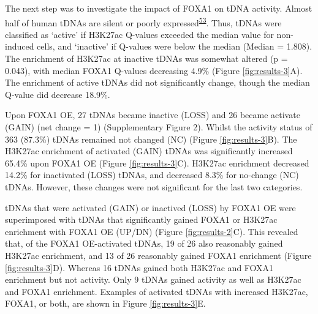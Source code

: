 \documentclass[
  12pt,
]{article}
\begin{document}
The next step was to investigate the impact of FOXA1 on tDNA activity.
Almost half of human tDNAs are silent or poorly expressed\textsuperscript{\protect\hyperlink{ref-Torres2019}{53}}.
Thus, tDNAs were classified as `active' if H3K27ac Q-values exceeded the median value for non-induced cells, and `inactive' if Q-values were below the median (Median = 1.808).
The enrichment of H3K27ac at inactive tDNAs was somewhat altered (p = 0.043), with median FOXA1 Q-values decreasing 4.9\% (Figure \ref{fig:results-3}A).
The enrichment of active tDNAs did not significantly change, though the median Q-value did decrease 18.9\%.

Upon FOXA1 OE, 27 tDNAs became inactive (LOSS) and 26 became activate (GAIN) (net change = 1) (Supplementary Figure 2).
Whilst the activity status of 363 (87.3\%) tDNAs remained not changed (NC) (Figure \ref{fig:results-3}B).
The H3K27ac enrichment of activated (GAIN) tDNAs was significantly increased 65.4\% upon FOXA1 OE (Figure \ref{fig:results-3}C).
H3K27ac enrichment decreased 14.2\% for inactivated (LOSS) tDNAs, and decreased 8.3\% for no-change (NC) tDNAs.
However, these changes were not significant for the last two categories.

tDNAs that were activated (GAIN) or inactived (LOSS) by FOXA1 OE were superimposed with tDNAs that significantly gained FOXA1 or H3K27ac enrichment with FOXA1 OE (UP/DN) (Figure \ref{fig:results-2}C).
This revealed that, of the FOXA1 OE-activated tDNAs, 19 of 26 also reasonably gained H3K27ac enrichment, and 13 of 26 reasonably gained FOXA1 enrichment (Figure \ref{fig:results-3}D).
Whereas 16 tDNAs gained both H3K27ac and FOXA1 enrichment but not activity.
Only 9 tDNAs gained activity as well as H3K27ac and FOXA1 enrichment.
Examples of activated tDNAs with increased H3K27ac, FOXA1, or both, are shown in Figure \ref{fig:results-3}E.
\end{document}
